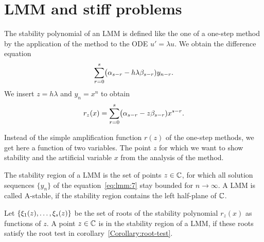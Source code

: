 \section{LMM and stiff problems}

\begin{definition}
  The stability polynomial of an LMM is defined like the one of a
  one-step method by the application of the method to the ODE
  $u'=\lambda u$. We obtain the difference equation
  \begin{gather}
    \label{eq:lmm:7}
    \sum_{r=0}^{s} \bigl(\alpha_{s-r} - h\lambda \beta_{s-r}) y_{n-r}.
  \end{gather}
  We  insert $z=h\lambda$ and $y_n = x^n$ to obtain
  \begin{gather}
    \label{eq:lmm:8}
    r_z(x) = \sum_{r=0}^{s} \bigl(\alpha_{s-r} - z \beta_{s-r})
    x^{s-r}.
  \end{gather}
\end{definition}

\begin{remark}
  Instead of the simple amplification function $r(z)$ of the one-step
  methods, we get here a function of two variables.  The point $z$ for
  which we want to show stability and the artificial variable $x$ from
  the analysis of the method.
\end{remark}

\begin{definition}
  The stability region of a LMM is the set of points $z\in \mathbb C$,
  for which all solution sequences $\{y_n\}$ of the equation~\eqref{eq:lmm:7}
  stay bounded for $n\to\infty$. A LMM is called A-stable, if the 
  stability region contains the left half-plane of $\mathbb C$.
\end{definition}

\begin{lemma}
  Let $\{\xi_1(z),\dots,\xi_s(z)\}$ be the set of roots of the
  stability polynomial $r_z(x)$ as functions of $z$.
  A point $z\in \mathbb C$ is in the stability region of a LMM, if these
  roots satisfy the root test in corollary~\ref{Corollary:root-test}.
\end{lemma}

